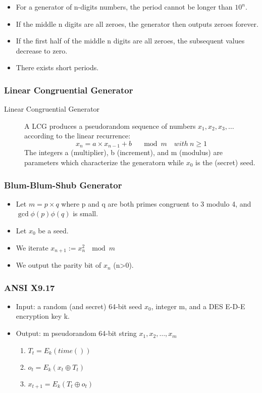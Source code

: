 \begin{itemize}
    \item For a generator of n-digits numbers, the period cannot be longer than
    $10^n$.
    \item If the middle n digits are all zeroes, the generator then outputs
    zeroes forever.
    \item If the first half of the middle n digits are all zeroes, the
    subsequent values decrease to zero.
    \item There exists short periods.
\end{itemize}

\subsubsection{Linear Congruential Generator}
\begin{description}
    \item[Linear Congruential Generator] A LCG produces a pseudorandom sequence
    of numbers $x_1,x_2,x_3,\ldots$ according to the linear recurrence:
    $$ x_n = a\times x_{n-1} + b \quad \mod{m}\quad with\ n \geq 1 $$
    The integers a (multiplier), b (increment), and m (modulus) are parameters
    which characterize the generatorn while $x_0$ is the (secret) seed.
\end{description}

\subsubsection{Blum-Blum-Shub Generator}
\begin{itemize}
    \item Let $m=p\times q$ where p and q are both primes congruent to 3 modulo
    4, and $ \gcd{\phi(p)}{\phi(q)} $ is small.
    \item Let $x_0$ be a seed.
    \item We iterate $x_{n+1} := x^2_n\ \mod{m}$
    \item We output the parity bit of $x_n$ (n>0).
\end{itemize}

\subsubsection{ANSI X9.17}

\begin{itemize}
    \item Input: a random (and secret) 64-bit seed $x_0$, integer m, and a
    DES E-D-E encryption key k.
    \item Output: m pseudorandom 64-bit string $x_1,x_2,\ldots,x_m$
    \begin{enumerate}
        \item $T_t = E_k(time())$
        \item $o_t = E_k(x_t \oplus T_t)$
        \item $x_{t+1} = E_k(T_t \oplus o_t)$
    \end{enumerate}
\end{itemize}


